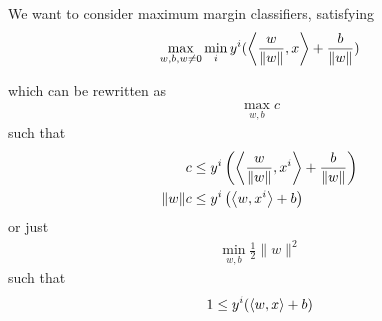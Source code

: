 We want to consider maximum margin classifiers, satisfying
\begin{align}
  \label{eq:92}
  \max_{w, b, w \neq 0} \min_{i} y^{i}(\IP{\frac{w}{\| w \|}, x} +
  \frac{b}{\| w \|})
\end{align}

which can be rewritten as
\begin{align}
  \label{eq:93}
  \max_{w, b} c
\end{align} such that
\begin{align}
  \label{eq:94}
  c &\leq y^{i} \left( \IP{\frac{w}{\| w \|}, x^{i}} + \frac{b}{\| w
      \|} \right) \\
  \| w \| c &\leq y^{i} \left(\IP{w, x^{i}} + b \right) \\
\end{align}
or just
\begin{align}
  \label{eq:95}
  \min_{w, b} \frac{1}{2} \| w \|^{2}
\end{align} such that
\begin{align}
  \label{eq:96}
  1 \leq y^{i} (\IP{w, x} + b)
\end{align}

